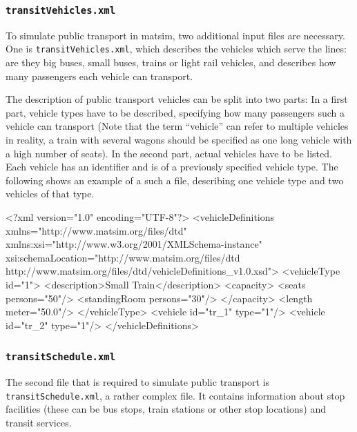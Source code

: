\subsubsection{\lstinline|transitVehicles.xml|}
\label{sec:inputdata:transitvehicles}


 

To simulate public transport in \gls{matsim}, two additional input files are necessary. One is \lstinline|transitVehicles.xml|, which describes the vehicles which serve the lines: are they big buses, small buses, trains or light rail vehicles, and describes how many passengers each vehicle can transport.

The description of public transport vehicles can be split into two parts: In a first part, vehicle types have to be described, specifying how many passengers such a vehicle can transport (Note that the term ``vehicle'' can refer to multiple vehicles in reality, \eg a train with several wagons should be specified as one long vehicle with a high number of seats). In the second part, actual vehicles have to be listed. Each vehicle has an identifier and is of a previously specified vehicle type. The following shows an example of a such a file, describing one vehicle type and two vehicles of that type. 

\begin{xml}
<?xml version="1.0" encoding="UTF-8"?> 
<vehicleDefinitions xmlns="http://www.matsim.org/files/dtd" 
       xmlns:xsi="http://www.w3.org/2001/XMLSchema-instance" 
       xsi:schemaLocation="http://www.matsim.org/files/dtd http://www.matsim.org/files/dtd/vehicleDefinitions_v1.0.xsd"> 
	<vehicleType id="1"> 
      <description>Small Train</description> 
      <capacity> 
         <seats persons="50"/> 
         <standingRoom persons="30"/> 
      </capacity> 
      <length meter="50.0"/> 
   </vehicleType> 
   <vehicle id="tr_1" type="1"/> 
   <vehicle id="tr_2" type="1"/> 
</vehicleDefinitions>
\end{xml}

\subsubsection{\lstinline|transitSchedule.xml|}
\label{sec:inputdata:transitschedule}
The second file that is required to simulate public transport is \lstinline|transitSchedule.xml|, a rather complex file. It contains information about stop facilities (these can be bus stops, train stations or other stop locations) and transit services.


